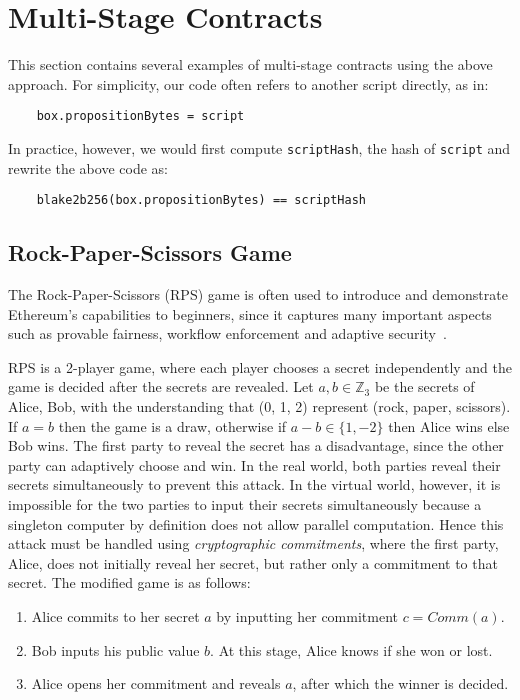 \documentclass[runningheads]{llncs}
\begin{document}
\section{Multi-Stage Contracts}

This section contains several examples of multi-stage contracts using the above approach.
For simplicity, our code often refers to another script directly, as in: 
\begin{verbatim}
    box.propositionBytes = script
\end{verbatim}
   
In practice, however, we would first compute \texttt{scriptHash}, the hash of \texttt{script} and rewrite the above code as: 
\begin{verbatim}
    blake2b256(box.propositionBytes) == scriptHash
\end{verbatim}

\subsection{Rock-Paper-Scissors Game}
\label{rps}

The Rock-Paper-Scissors (RPS) game is often used to introduce and demonstrate Ethereum's capabilities to beginners, since it captures many important
aspects such as provable fairness, workflow enforcement and adaptive security~\cite{rps15}. 

RPS is a 2-player game, where each player chooses a secret independently and the game is decided after the secrets are revealed. 
Let $a, b\in \mathbb{Z}_3$ be the secrets of Alice, Bob, with the understanding that (0, 1, 2) represent (rock, paper, scissors). If $a = b$ then the game is a draw, otherwise if $a-b \in \{1, -2\}$ then Alice wins else Bob wins. 
The first party to reveal the secret has a disadvantage, since the other party can adaptively choose and win. In the real world, both parties reveal their secrets simultaneously to prevent this attack. In the virtual world, however, it is impossible for the two parties to input their secrets simultaneously because a singleton computer by definition does not allow parallel computation. Hence this attack must be handled using {\em cryptographic commitments}, where the first party, Alice, does not initially reveal her secret, but rather only a commitment to that secret. The modified game is as follows:

\begin{enumerate}
	\item Alice commits to her secret $a$ by inputting her commitment $c = Comm(a)$.
	\item Bob inputs his public value $b$. At this stage, Alice knows if she won or lost.
	\item Alice opens her commitment and reveals $a$, after which the winner is decided.
\end{enumerate}
\end{document}
